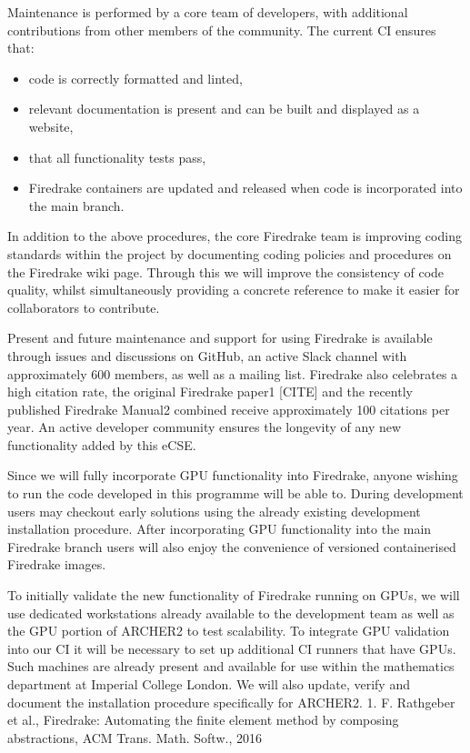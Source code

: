 \documentclass[a4paper,11pt]{article}
\begin{document}
Maintenance is performed by a core team of developers, with additional contributions from other members of the community. The current CI ensures that: 
\begin{itemize}
	\item code is correctly formatted and linted,
	\item relevant documentation is present and can be built and displayed as a website,
	\item that all functionality tests pass,
	\item Firedrake containers are updated and released when code is incorporated into the main branch.
\end{itemize}
In addition to the above procedures, the core Firedrake team is improving coding standards within the project by documenting coding policies and procedures on the Firedrake wiki page.
Through this we will improve the consistency of code quality, whilst simultaneously providing a concrete reference to make it easier for collaborators to contribute. 

Present and future maintenance and support for using Firedrake is available through issues and discussions on GitHub, an active Slack channel with approximately 600 members, as well as a mailing list.
Firedrake also celebrates a high citation rate, the original Firedrake paper1 [CITE] and the recently published Firedrake Manual2 combined receive approximately 100 citations per year.
An active developer community ensures the longevity of any new functionality added by this eCSE. 

Since we will fully incorporate GPU functionality into Firedrake, anyone wishing to run the code developed in this programme will be able to.
During development users may checkout early solutions using the already existing development installation procedure.
After incorporating GPU functionality into the main Firedrake branch users will also enjoy the convenience of versioned containerised Firedrake images. 

To initially validate the new functionality of Firedrake running on GPUs, we will use dedicated workstations already available to the development team as well as the GPU portion of ARCHER2 to test scalability.
To integrate GPU validation into our CI it will be necessary to set up additional CI runners that have GPUs. Such machines are already present and available for use within the mathematics department at Imperial College London.
We will also update, verify and document the installation procedure specifically for ARCHER2.
1. F. Rathgeber et al., Firedrake: Automating the finite element method by composing abstractions, ACM Trans. Math. Softw., 2016
\end{document}
